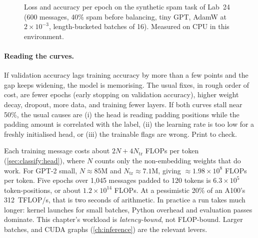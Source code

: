 \begin{figure}[ht]
\centering
{}
\caption{Loss and accuracy per epoch on the synthetic spam task of Lab~24 (600 messages,
40\% spam before balancing, tiny GPT, AdamW at $2\times10^{-3}$, length-bucketed batches
of 16). Measured on CPU in this environment.}
\label{fig:classify:curves}
\end{figure}

\paragraph{Reading the curves.} If validation accuracy lags training accuracy by more
than a few points and the gap keeps widening, the model is memorising. The usual fixes,
in rough order of cost, are fewer epochs (early stopping on validation accuracy),
higher weight decay, dropout, more data, and training fewer layers. If both curves
stall near 50\%, the usual causes are (i) the head is reading padding positions while
the padding amount is correlated with the label, (ii) the learning rate is too low for
a freshly initialised head, or (iii) the trainable flags are wrong. Print
 to check.

\begin{napkinmath}
Each training message costs about $2N + 4N_{\text{tr}}$ FLOPs per token
(\cref{sec:classify:head}), where $N$ counts only the non-embedding weights that do
work. For GPT-2 small, $N\approx 85$M and $N_{\text{tr}}\approx 7.1$M, giving
$\approx 1.98\times10^8$ FLOPs per token. Five epochs over 1{,}045 messages padded to
120 tokens is $6.3\times10^5$ token-positions, or about $1.2\times10^{14}$ FLOPs. At a
pessimistic 20\% of an A100's \SI{312}{TFLOP/s}, that is two seconds of arithmetic. In
practice a run takes much longer: kernel launches for small batches, Python overhead
and evaluation passes dominate. This chapter's workload is \emph{latency-bound}, not
FLOP-bound. Larger batches,  and CUDA graphs (\cref{ch:inference})
are the relevant levers.
\end{napkinmath}

